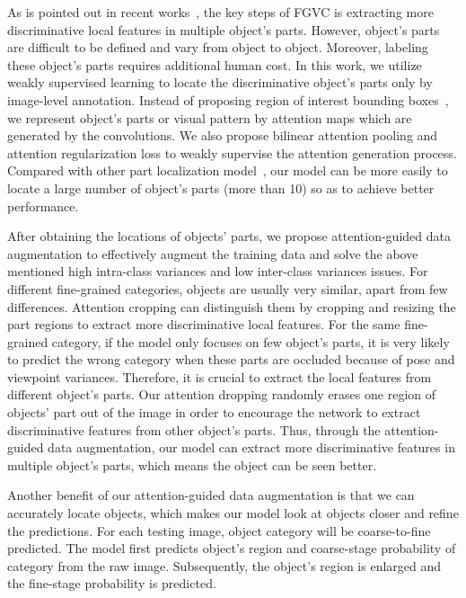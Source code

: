 \documentclass[10pt,twocolumn,letterpaper]{article}
\begin{document}
As is pointed out in recent works~\cite{ra-cnn, ma-cnn, mask-cnn}, the key steps of FGVC is extracting more discriminative local features in multiple object's parts. However, object's parts are difficult to be defined and vary from object to object. Moreover, labeling these object's parts requires additional human cost. In this work, we utilize weakly supervised learning to locate the discriminative object's parts only by image-level annotation. Instead of proposing region of interest bounding boxes~\cite{wsddn,ra-cnn}, we represent object's parts or visual pattern by attention maps which are generated by the convolutions. We also propose bilinear attention pooling and attention regularization loss to weakly supervise the attention generation process. Compared with other part localization model~\cite{ma-cnn,mask-cnn}, our model can be more easily to locate a large number of object's parts (more than 10) so as to achieve better performance.

After obtaining the locations of objects' parts, we propose attention-guided data augmentation to effectively augment the training data and solve the above mentioned high intra-class variances and low inter-class variances issues. For different fine-grained categories, objects are usually very similar, apart from few differences. Attention cropping can distinguish them by cropping and resizing the part regions to extract more discriminative local features. For the same fine-grained category, if the model only focuses on few object's parts, it is very likely to predict the wrong category when these parts are occluded because of pose and viewpoint variances. Therefore, it is crucial to extract the local features from different object's parts. Our attention dropping randomly erases one region of objects' part out of the image in order to encourage the network to extract discriminative features from other object's parts. Thus, through the attention-guided data augmentation, our model can extract more discriminative features in multiple object's parts, which means the object can be seen better.

Another benefit of our attention-guided data augmentation is that we can accurately locate objects, which makes our model look at objects closer and refine the predictions. For each testing image, object category will be coarse-to-fine predicted. The model first predicts object's region and coarse-stage probability of category from the raw image. Subsequently, the object's region is enlarged and the fine-stage probability is predicted.
\end{document}
